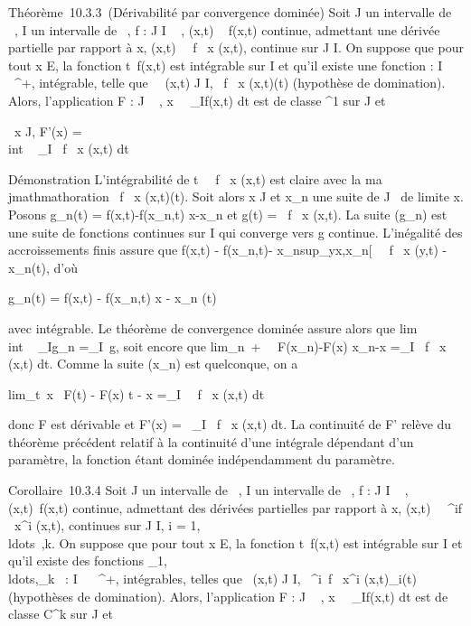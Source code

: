 \documentclass[]{article}
\begin{document}
Théorème~10.3.3~(Dérivabilité par convergence dominée) Soit J un
intervalle de ~, I un intervalle de ~, f : J \times I \rightarrow~ , (x,t) \rightarrow~ f(x,t)
continue, admettant une dérivée partielle par rapport à x,
(x,t)\mapsto~ \partial~f \over \partial~x (x,t),
continue sur J \times I. On suppose que pour tout x \in E, la fonction
t\mapsto~f(x,t) est intégrable sur I et qu'il existe
une fonction \phi : I \rightarrow~ ~^+, intégrable, telle que
\forall~~(x,t) \in J \times I,  \partial~f
\over \partial~x (x,t)\leq \phi(t) (hypothèse de
domination). Alors, l'application F : J \rightarrow~ ,
x\mapsto~\int ~
_If(x,t) dt est de classe ^1 sur J et

\forall~x \in J, F'(x) =\\int ~
_I \partial~f \over \partial~x (x,t) dt

Démonstration L'intégrabilité de t\mapsto~ \partial~f
\over \partial~x (x,t) est claire avec la ma\\jmathmathoration
 \partial~f \over \partial~x (x,t)\leq \phi(t). Soit
alors x \in J et x_n une suite de J
\diagdown\x\ de limite x. Posons
g_n(t) = f(x,t)-f(x_n,t) \over
x-x_n et g(t) = \partial~f \over \partial~x (x,t). La
suite (g_n) est une suite de fonctions continues sur I qui
converge vers g continue. L'inégalité des accroissements finis assure
que f(x,t) - f(x_n,t)\leqx -
x_nsup_y\in{]}x,x_n{[}~\left
 \partial~f \over \partial~x (y,t)\right
\leqx - x_n\phi(t), d'où

g_n(t) = \left 
f(x,t) - f(x_n,t) \over x - x_n
\right \leq \phi(t)

avec \phi intégrable. Le théorème de convergence dominée assure alors que
lim\\int ~
_Ig_n =\int  _I~g, soit
encore que lim_n\rightarrow~+\infty~~
F(x_n)-F(x) \over x_n-x
=\int  _I \partial~f \over \partial~x~
(x,t) dt. Comme la suite (x_n) est quelconque, on a

lim_t\rightarrow~x~ F(t) - F(x)
\over t - x =\int  _I~
\partial~f \over \partial~x (x,t) dt

donc F est dérivable et F'(x) =\int ~
_I \partial~f \over \partial~x (x,t) dt. La continuité de F'
relève du théorème précédent relatif à la continuité d'une intégrale
dépendant d'un paramètre, la fonction étant dominée indépendamment du
paramètre.

Corollaire~10.3.4 Soit J un intervalle de ~, I un intervalle de ~, f : J
\times I \rightarrow~ , (x,t)\mapsto~f(x,t) continue, admettant des
dérivées partielles par rapport à x, (x,t)\mapsto~
\partial~^if \over \partial~x^i (x,t), continues
sur J \times I, i =
1,\\ldots~,k. On
suppose que pour tout x \in E, la fonction
t\mapsto~f(x,t) est intégrable sur I et qu'il existe
des fonctions
\phi_1,\\ldots,\phi_k~
: I \rightarrow~ ~^+, intégrables, telles que
\forall~(x,t) \in J \times I,  \partial~^i~f
\over \partial~x^i (x,t)\leq \phi_i(t)
(hypothèses de domination). Alors, l'application F : J \rightarrow~ ,
x\mapsto~\int ~
_If(x,t) dt est de classe C^k sur J et
\end{document}
